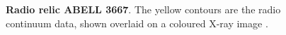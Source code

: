 \begin{figure}
\centering
{}
\caption[Radio relic]{\textbf{Radio relic ABELL 3667}. The yellow contours are the radio continuum data, shown overlaid on a coloured X-ray image \cite{johnston2003detection}.}
\label{fig:radio-relic}
\end{figure}

